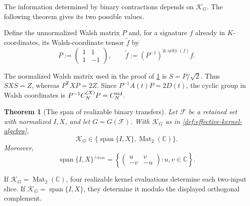 \documentclass[11pt,letterpaper,onecolumn]{article}
\theoremstyle{plain}
\newtheorem{theorem}{Theorem}[section]
\theoremstyle{definition}
\theoremstyle{remark}
\newcommand{\cF}{\mathcal F}
\newcommand{\CycX}[1]{{C_{#1}^{(X)}}}
\newcommand{\Mat}{\operatorname{Mat}}
\newcommand{\Span}{\operatorname{span}}
\newcommand{\arity}{\operatorname{arity}}
\begin{document}
The information determined by binary contractions depends on
\(\mathscr K_G\).  The following theorem gives its two possible values.

Define the unnormalized Walsh matrix \(P\) and, for a signature \(f\)
already in \(K\)-coordinates, its Walsh-coordinate tensor \(\widetilde f\) by
\begin{equation}
  P:=\begin{pmatrix}1&1\\1&-1\end{pmatrix},
  \qquad
  \widetilde f:=(P^{-1})^{\otimes\arity(f)}f.
  \label{eq:Walsh-coordinates}
\end{equation}

The normalized Walsh matrix used in the proof of
\cref{thm:dressed-kernel-observability} is
\(S=P/\sqrt2\). Thus \(SXS=Z\), whereas \(P^{\mathsf T}XP=2Z\).
Since \(P^{-1}A(t)P=2D(t)\), the cyclic group in Walsh coordinates is
\(P^{-1}\CycX{N}P=C_N^{\rm std}\).


\begin{theorem}[The span of realizable binary transfers]
\label{thm:dressed-kernel-observability}
Let \(\cF\) be a retained set with normalized \(I,X\), and let
\(G=G(\cF)\).  With \(\mathscr K_G\) as in
\cref{def:effective-kernel-algebra},
\[
  \mathscr K_G\in
  \bigl\{\Span\{I,X\},\Mat_2(\mathbb C)\bigr\}.
\]
Moreover,
\[
 \Span\{I,X\}^{\perp_{\mathrm{Frob}}}
 =
 \left\{
  \begin{pmatrix}u&v\\-v&-u\end{pmatrix}:u,v\in\mathbb C
 \right\}.
\]
\end{theorem}

If \(\mathscr K_G=\Mat_2(\mathbb C)\), four realizable kernel evaluations
determine each two-input slice.  If \(\mathscr K_G=\Span\{I,X\}\), they
determine it modulo the displayed orthogonal complement.
\end{document}
